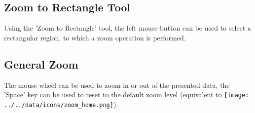 




\subsection{Zoom to Rectangle Tool}

Using the 'Zoom to Rectangle' tool, the left mouse-button can be used to select a rectangular region, to which a zoom operation is performed. \\

\subsection{General Zoom}

The mouse wheel can be used to zoom in or out of the presented data, the 'Space' key can be used to reset to the default zoom level (equivalent to \texttt{[image: ../../data/icons/zoom\_home.png]}).
